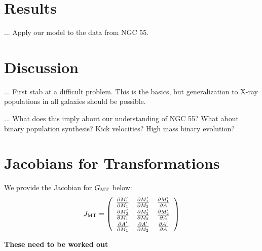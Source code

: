 \documentclass[12pt, preprint]{aastex}
\begin{document}
\section{Results}

... Apply our model to the data from NGC 55. 

\section{Discussion}

... First stab at a difficult problem. This is the basics, but generalization to X-ray populations in all galaxies should be possible.

... What does this imply about our understanding of NGC 55? What about binary population synthesis? Kick velocities? High mass binary evolution?



\appendix

\section{Jacobians for Transformations}

We provide the Jacobian for $G_{\rm MT}$ below:
\[  J_{\rm MT} = \left( \begin{array}{ccc}
\frac{\partial M_1'}{\partial M_1} & \frac{\partial M_1'}{\partial M_2} & \frac{\partial M_1'}{\partial A}  \\[0.3em]
\frac{\partial M_2'}{\partial M_1}  & \frac{\partial M_2'}{\partial M_2} & \frac{\partial M_2'}{\partial A} \\[0.3em]
\frac{\partial A'}{\partial M_1} & \frac{\partial A'}{\partial M_2} & \frac{\partial A'}{\partial A}  \end{array} \right)\]

{\bf These need to be worked out}
\end{document}
